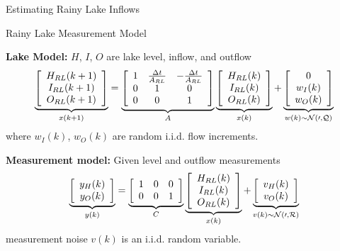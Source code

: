 \documentclass[compress,english]{beamer}
\begin{document}
{{{{{{\begin{frame}{Estimating Rainy Lake Inflows}

\end{frame}

\begin{frame}{Rainy Lake Measurement Model}

{\bf Lake Model:} $H$, $I$, $O$ are lake level, inflow, and outflow
$$\underbrace{\left[\begin{array}{c} H_{RL}(k+1) \\ I_{RL}(k+1) \\ O_{RL}(k+1) \end{array}\right]}_{x(k+1)} = \underbrace{\left[ \begin{array}{ccc} 1 & \frac{\Delta t}{A_{RL}} & -\frac{\Delta t}{A_{RL}} \\0 & 1 & 0\\0 & 0 & 1\end{array}\right]}_{A} \underbrace{\left[\begin{array}{c} H_{RL}(k) \\ I_{RL}(k) \\ O_{RL}(k) \end{array}\right]}_{x(k)} + \underbrace{\left[ \begin{array}{c} 0 \\ w_{I}(k) \\ w_{O}(k)\end{array}\right]}_{w(k)\sim\cal{N}(0,Q)}$$
where $w_I(k)$, $w_O(k)$ are random i.i.d. flow increments.

{\bf Measurement model:} Given level and outflow measurements
$$\underbrace{\left[\begin{array}{c} y_H(k) \\ y_O(k) \end{array}\right]}_{y(k)} = \underbrace{\left[\begin{array}{ccc} 1 & 0 & 0 \\ 0 & 0 & 1 \end{array}\right]}_{C} \underbrace{\left[\begin{array}{c} H_{RL}(k) \\ I_{RL}(k) \\ O_{RL}(k) \end{array}\right]}_{x(k)} + \underbrace{\left[\begin{array}{c} v_{H}(k) \\ v_{O}(k) \end{array}\right]}_{v(k)\sim\cal{N}(0,R)} $$
measurement noise $v(k)$ is an i.i.d. random variable.


\end{frame}}}}}}}
\end{document}

